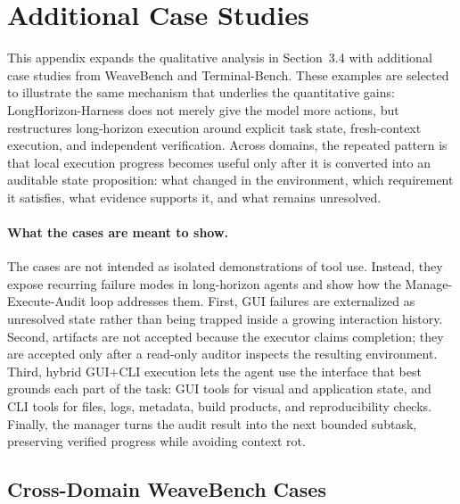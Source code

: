 \section{Additional Case Studies}
\label{app:additional-case-studies}

This appendix expands the qualitative analysis in Section~3.4 with additional case studies from WeaveBench and Terminal-Bench. These examples are selected to illustrate the same mechanism that underlies the quantitative gains: LongHorizon-Harness does not merely give the model more actions, but restructures long-horizon execution around explicit task state, fresh-context execution, and independent verification. Across domains, the repeated pattern is that local execution progress becomes useful only after it is converted into an auditable state proposition: what changed in the environment, which requirement it satisfies, what evidence supports it, and what remains unresolved.

\paragraph{What the cases are meant to show.}
The cases are not intended as isolated demonstrations of tool use. Instead, they expose recurring failure modes in long-horizon agents and show how the Manage-Execute-Audit loop addresses them. First, GUI failures are externalized as unresolved state rather than being trapped inside a growing interaction history. Second, artifacts are not accepted because the executor claims completion; they are accepted only after a read-only auditor inspects the resulting environment. Third, hybrid GUI+CLI execution lets the agent use the interface that best grounds each part of the task: GUI tools for visual and application state, and CLI tools for files, logs, metadata, build products, and reproducibility checks. Finally, the manager turns the audit result into the next bounded subtask, preserving verified progress while avoiding context rot.

\subsection{Cross-Domain WeaveBench Cases}
\label{app:weavebench-additional-cases}

